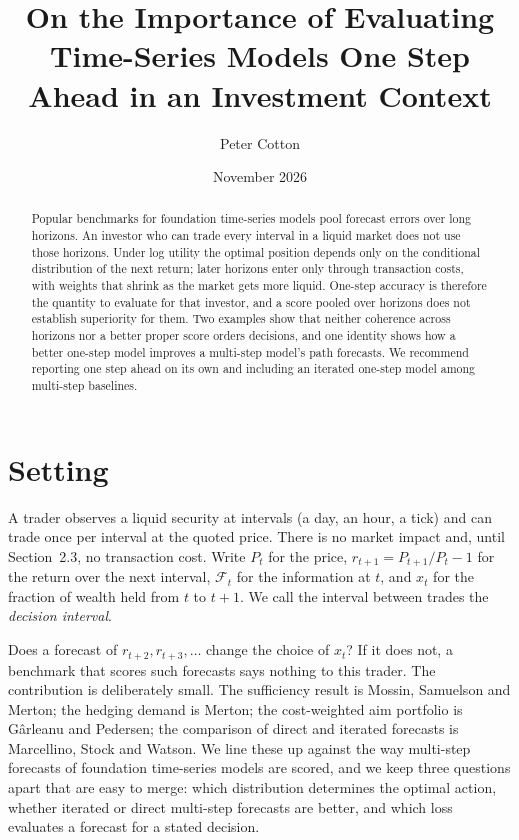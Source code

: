 \documentclass[11pt]{article}
\title{On the Importance of Evaluating Time-Series Models One Step Ahead in an Investment Context}
\author{Peter Cotton}
\date{November 2026}
\newcommand{\F}{\mathcal{F}}
\begin{document}
\maketitle

\begin{abstract}
Popular benchmarks for foundation time-series models pool forecast errors over long horizons. An investor who can trade every interval in a liquid market does not use those horizons. Under log utility the optimal position depends only on the conditional distribution of the next return; later horizons enter only through transaction costs, with weights that shrink as the market gets more liquid. One-step accuracy is therefore the quantity to evaluate for that investor, and a score pooled over horizons does not establish superiority for them. Two examples show that neither coherence across horizons nor a better proper score orders decisions, and one identity shows how a better one-step model improves a multi-step model's path forecasts. We recommend reporting one step ahead on its own and including an iterated one-step model among multi-step baselines.
\end{abstract}

\section{Setting}

A trader observes a liquid security at intervals (a day, an hour, a tick) and can trade once per interval at the quoted price. There is no market impact and, until Section~2.3, no transaction cost. Write $P_t$ for the price, $r_{t+1} = P_{t+1}/P_t - 1$ for the return over the next interval, $\F_t$ for the information at $t$, and $x_t$ for the fraction of wealth held from $t$ to $t+1$. We call the interval between trades the \emph{decision interval}.

Does a forecast of $r_{t+2}, r_{t+3}, \dots$ change the choice of $x_t$? If it does not, a benchmark that scores such forecasts says nothing to this trader. The contribution is deliberately small. The sufficiency result is Mossin, Samuelson and Merton; the hedging demand is Merton; the cost-weighted aim portfolio is Gârleanu and Pedersen; the comparison of direct and iterated forecasts is Marcellino, Stock and Watson. We line these up against the way multi-step forecasts of foundation time-series models are scored, and we keep three questions apart that are easy to merge: which distribution determines the optimal action, whether iterated or direct multi-step forecasts are better, and which loss evaluates a forecast for a stated decision.
\end{document}
